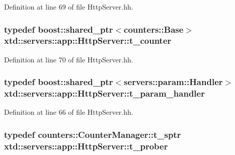 Definition at line 69 of file Http\+Server.\+hh.

\subsubsection[{\texorpdfstring{t\+\_\+counter}{t_counter}}]{\setlength{\rightskip}{0pt plus 5cm}typedef boost\+::shared\+\_\+ptr$<$counters\+::\+Base$>$ {\bf xtd\+::servers\+::app\+::\+Http\+Server\+::t\+\_\+counter}\hspace{0.3cm}{\ttfamily [protected]}}\hypertarget{classxtd_1_1servers_1_1app_1_1HttpServer_aaef467afe1f5191f38758088615c09c0}{}\label{classxtd_1_1servers_1_1app_1_1HttpServer_aaef467afe1f5191f38758088615c09c0}


Definition at line 70 of file Http\+Server.\+hh.

\subsubsection[{\texorpdfstring{t\+\_\+param\+\_\+handler}{t_param_handler}}]{\setlength{\rightskip}{0pt plus 5cm}typedef boost\+::shared\+\_\+ptr$<${\bf servers\+::param\+::\+Handler}$>$ {\bf xtd\+::servers\+::app\+::\+Http\+Server\+::t\+\_\+param\+\_\+handler}\hspace{0.3cm}{\ttfamily [protected]}}\hypertarget{classxtd_1_1servers_1_1app_1_1HttpServer_a9704ed4f011ec3a7424da2f2229477e1}{}\label{classxtd_1_1servers_1_1app_1_1HttpServer_a9704ed4f011ec3a7424da2f2229477e1}


Definition at line 66 of file Http\+Server.\+hh.

\subsubsection[{\texorpdfstring{t\+\_\+prober}{t_prober}}]{\setlength{\rightskip}{0pt plus 5cm}typedef counters\+::\+Counter\+Manager\+::t\+\_\+sptr {\bf xtd\+::servers\+::app\+::\+Http\+Server\+::t\+\_\+prober}\hspace{0.3cm}{\ttfamily [protected]}}\hypertarget{classxtd_1_1servers_1_1app_1_1HttpServer_ace89439f838ede46ec55a6ec7cc27888}{}\label{classxtd_1_1servers_1_1app_1_1HttpServer_ace89439f838ede46ec55a6ec7cc27888}


